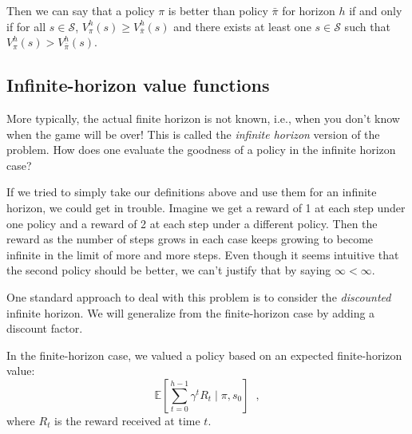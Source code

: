 

Then we can say that a policy $\pi$ is better than policy $\bar{\pi}$ for horizon
$h$ if and only if for all $s \in \mathcal S$,
$V_{\pi}^h(s) \geq V_{\bar{\pi}}^h(s)$ and there exists at least one $s
  \in \mathcal S$ such that $V_{\pi}^h(s) > V_{\bar{\pi}}^h(s)$.

\subsection{Infinite-horizon value functions}
\label{sec-mdp_infinite_horizon}
\label{sec-discount}

More typically, the actual finite horizon is not known, i.e., when you
don't know when the game will be over!  This is called the {\em
    infinite horizon} version of the problem.  How does one evaluate the
goodness of a policy in the infinite horizon case?

If we tried to simply take our definitions above and use them for an
infinite horizon, we could get in trouble. Imagine we get a reward of
1 at each step under one policy and a reward of 2 at each step under a
different policy. Then the reward as the number of steps grows in each
case keeps growing to become infinite in the limit of more and more
steps. Even though it seems intuitive that the second policy should
be better, we can't justify that by saying $\infty < \infty$.

One standard approach to deal with this problem is to consider the
\emph{discounted} infinite horizon.
We will generalize from the finite-horizon case by adding a discount factor.

In the finite-horizon case, we valued a
policy based on an expected finite-horizon value:
\begin{equation}
  \mathbb{E}\left[\sum_{t = 0}^{h-1} \gamma^t R_t \mid \pi, s_0\right]\;\;,
  \label{eq:exp_finite}
\end{equation}
where $R_t$ is the reward received at time $t$.

